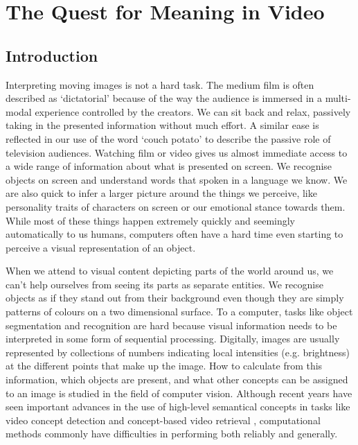\chapter{The Quest for Meaning in Video}
\label{ch:quest}

\section{Introduction} %
\label{sec:introduction}

Interpreting moving images is not a hard task. The medium film is often described as `dictatorial' because of the way the audience is immersed in a multi-modal experience controlled by the creators. We can sit back and relax, passively taking in the presented information without much effort. A similar ease is reflected in our use of the word `couch potato' to describe the passive role of television audiences. Watching film or video gives us almost immediate access to a wide range of information about what is presented on screen. We recognise objects on screen and understand words that spoken in a language we know. We are also quick to infer a larger picture around the things we perceive, like personality traits of characters on screen or our emotional stance towards them. While most of these things happen extremely quickly and seemingly automatically to us humans, computers often have a hard time even starting to perceive a visual representation of an object.

When we attend to visual content depicting parts of the world around us, we can't help ourselves from seeing its parts as separate entities. We recognise objects as if they stand out from their background even though they are simply patterns of colours on a two dimensional surface. To a computer, tasks like object segmentation and recognition are hard because visual information needs to be interpreted in some form of sequential processing. Digitally, images are usually represented by collections of numbers indicating local intensities (e.g. brightness) at the different points that make up the image. How to calculate from this information, which objects are present, and what other concepts can be assigned to an image is studied in the field of computer vision. Although recent years have seen important advances in the use of high-level semantical concepts in tasks like video concept detection and concept-based video retrieval \cite{Snoek:2009dq, Snoek:jf, Worring:2007vm, Chang:2008wh}, computational methods commonly have difficulties in performing both reliably and generally.

